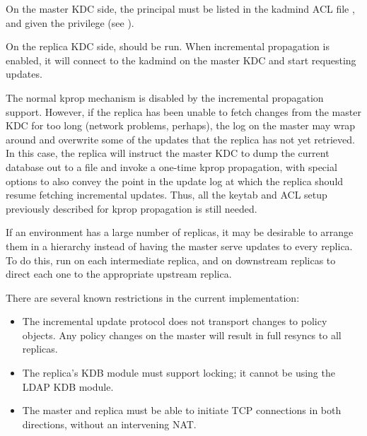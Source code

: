 \documentclass[letterpaper,10pt,english]{sphinxmanual}
\begin{document}
On the master KDC side, the  principal must be
listed in the kadmind ACL file {\hyperref[\detokenize{admin/conf_files/kadm5_acl:kadm5-acl-5}]{}}, and given the
 privilege (see {\hyperref[\detokenize{admin/database:privileges}]{}}).

On the replica KDC side, {\hyperref[\detokenize{admin/admin_commands/kpropd:kpropd-8}]{}} should be run.  When
incremental propagation is enabled, it will connect to the kadmind on
the master KDC and start requesting updates.

The normal kprop mechanism is disabled by the incremental propagation
support.  However, if the replica has been unable to fetch changes
from the master KDC for too long (network problems, perhaps), the log
on the master may wrap around and overwrite some of the updates that
the replica has not yet retrieved.  In this case, the replica will
instruct the master KDC to dump the current database out to a file and
invoke a one-time kprop propagation, with special options to also
convey the point in the update log at which the replica should resume
fetching incremental updates.  Thus, all the keytab and ACL setup
previously described for kprop propagation is still needed.

If an environment has a large number of replicas, it may be desirable
to arrange them in a hierarchy instead of having the master serve
updates to every replica.  To do this, run  on
each intermediate replica, and  on
downstream replicas to direct each one to the appropriate upstream
replica.

There are several known restrictions in the current implementation:
\begin{itemize}
\item {} 
The incremental update protocol does not transport changes to policy
objects.  Any policy changes on the master will result in full
resyncs to all replicas.

\item {} 
The replica’s KDB module must support locking; it cannot be using the
LDAP KDB module.

\item {} 
The master and replica must be able to initiate TCP connections in
both directions, without an intervening NAT.

\end{itemize}
\end{document}
